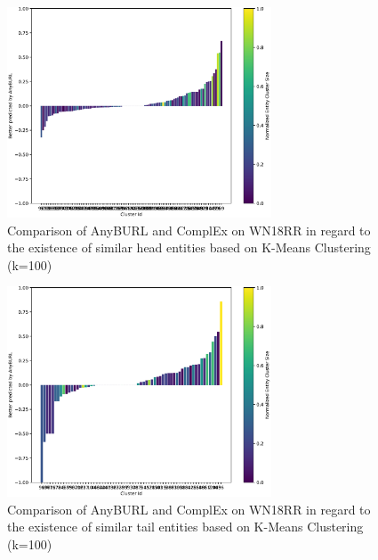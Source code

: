 \begin{figure}[H]
\centering
\includegraphics[width=0.7\textwidth]{images/head_cluster_100_anyburl_complex_yago.PNG}
\caption{Comparison of AnyBURL and ComplEx on WN18RR in regard to the existence of similar head entities based on K-Means Clustering (k=100)}
\label{fig:head_cluster_100_anyburl_complex_wnrr}
\end{figure}

\begin{figure}[H]
\centering
\includegraphics[width=0.7\textwidth]{images/tail_cluster_100_anyburl_complex_yago.PNG}
\caption{Comparison of AnyBURL and ComplEx on WN18RR in regard to the existence of similar tail entities based on K-Means Clustering (k=100)}
\label{fig:tail_cluster_100_anyburl_complex_wnrr}
\end{figure}